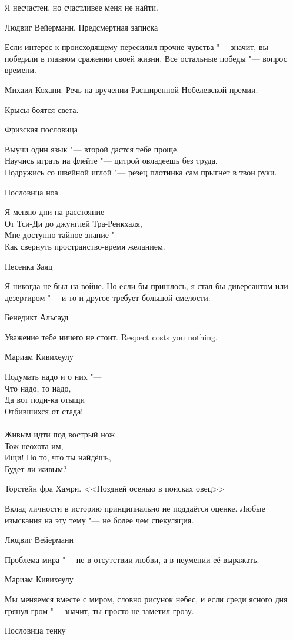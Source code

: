 \epigraph
{Я несчастен, но счастливее меня не найти.}
{Людвиг Вейерманн.
Предсмертная записка}

\epigraph
{Если интерес к происходящему пересилил прочие чувства "--- значит, вы победили в главном сражении своей жизни.
Все остальные победы "--- вопрос времени.}
{Михаил Кохани.
Речь на вручении Расширенной Нобелевской премии.}

\epigraph
{Крысы боятся света.}
{Фризская пословица}

\epigraph
{Выучи один язык "--- второй дастся тебе проще.\\
Научись играть на флейте "--- цитрой овладеешь без труда.\\
Подружись со швейной иглой "--- резец плотника сам прыгнет в твои руки.}
{Пословица ноа}

\epigraph
{Я меняю дни на расстояние\\
От Тси-Ди до джунглей Тра-Ренкхаля,\\
Мне доступно тайное знание "---\\
Как свернуть пространство-время желанием.}
{Песенка Заяц}

\epigraph
{Я никогда не был на войне.
Но если бы пришлось, я стал бы диверсантом или дезертиром "--- и то и другое требует большой смелости.}
{Бенедикт Альсауд}

\epigraph{
{Уважение тебе ничего не стоит.}
{Respect costs you nothing.}
}{Мариам Кивихеулу}

\epigraph
{Подумать надо и о них "---\\
Что надо, то надо,\\
Да вот поди-ка отыщи\\
Отбившихся от стада!\\
~\\
Живым идти под вострый нож\\
Тож неохота им,\\
Ищи! Но то, что ты найдёшь,\\
Будет ли живым?}
{Торстейн фра Хамри.
<<Поздней осенью в поисках овец>>}

\epigraph
{Вклад личности в историю принципиально не поддаётся оценке.
Любые изыскания на эту тему "--- не более чем спекуляция.}
{Людвиг Вейерманн}

\epigraph
{Проблема мира "--- не в отсутствии любви, а в неумении её выражать.}
{Мариам Кивихеулу}

\epigraph
{Мы меняемся вместе с миром, словно рисунок небес, и если среди ясного дня грянул гром "--- значит, ты просто не заметил грозу.}
{Пословица тенку}

